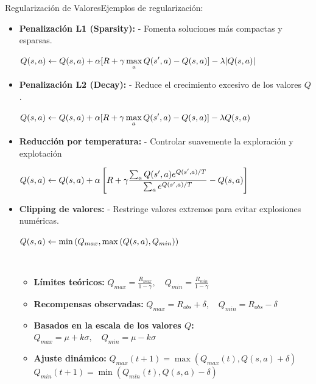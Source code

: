 \documentclass[10pt, envcountsect, handout, aspectratio=1610, hyperref={hypertexnames=true}]{beamer}
\begin{document}
\begin{frame}{Regularización de Valores}{Ejemplos de regularización:}
	\begin{itemize}		
	
		\item \textbf{Penalización L1 (Sparsity):} - Fomenta soluciones más compactas y esparsas.  
		
		\centerline{$\displaystyle
		Q(s, a) \gets Q(s, a) + \alpha [R + \gamma \max_a Q(s', a) - Q(s, a)] - \lambda  |Q(s, a)|
		$}
		
		
		
		\item \textbf{Penalización L2 (Decay):} 	- Reduce el crecimiento excesivo de los valores $Q$.
		
		\centerline{$\displaystyle
		Q(s, a) \gets Q(s, a) + \alpha [R + \gamma \max_a Q(s', a) - Q(s, a)] - \lambda Q(s, a)
		$}
		
		\item \textbf{Reducción por temperatura:} - Controlar suavemente la exploración y explotación 
		
		\centerline{$\displaystyle
		Q(s, a) \gets Q(s, a) + \alpha \left[ R + \gamma  \frac{\sum_a Q(s', a) e^{Q(s', a)/T}}{\sum_a e^{Q(s', a)/T}} - Q(s, a) \right]
		$}

		
		\item \textbf{Clipping de valores:} - Restringe valores extremos para evitar explosiones numéricas.  
		
		\centerline{$\displaystyle
		Q(s, a) \gets \min\left( Q_{max}, \max\left( Q(s, a), Q_{min} \right) \right)
		$}
		
		~
		
		
		\begin{itemize}
			\item \textbf{Límites teóricos:}  $
			Q_{max} = \frac{R_{max}}{1 - \gamma}, \quad Q_{min} = \frac{R_{min}}{1 - \gamma}
			$
		 
			
			\item \textbf{Recompensas observadas:}  $
			Q_{max} = R_{obs} + \delta, \quad Q_{min} = R_{obs} - \delta
			$
		
			\item \textbf{Basados en la escala de los valores \(Q\):} $
			Q_{max} = \mu + k\sigma, \quad Q_{min} = \mu - k\sigma
			$
			
			\item \textbf{Ajuste dinámico:}  
			$
			Q_{max}(t+1) = \max(Q_{max}(t), Q(s, a) + \delta)
			$
			$
			Q_{min}(t+1) = \min(Q_{min}(t), Q(s, a) - \delta)
			$
			
		\end{itemize}
		
		
		
	\end{itemize}


\end{frame}
\end{document}
